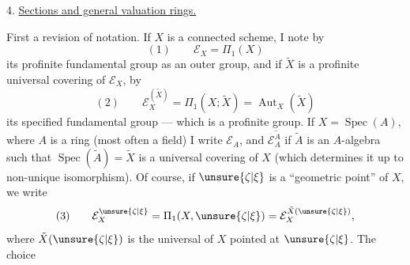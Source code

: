 4. \uline{Sections  and general valuation rings.}

First a revision of notation. If $X$ is a connected scheme, I note by 
\[
(1)\qquad \mathcal E_X=\Pi_1(X)
\]
its profinite fundamental group as an outer group, and if $\tilde X$ is a profinite universal covering of $\mathcal E_X$, by
\[
(2)\qquad \mathcal E_X^{(\tilde X)}=\Pi_1(X;\tilde X)=\operatorname{Aut}_X(\tilde X)
\]
its specified fundamental group --- which is a profinite group. If $X=\operatorname{Spec}(A)$, where $A$ is a ring (most often a field) I write $\mathcal E_A$, and $\mathcal E_A^{\tilde A}$  if $\tilde A$ is an $A$-algebra such that $\operatorname{Spec}(\tilde A)=\tilde X$ is a universal covering of $X$ (which determines it up to non-unique isomorphism). Of course, if $\unsure{\zeta|\xi}$ is a ``geometric point'' of $X$, we write
\[
(3)\qquad \mathcal E_X^{\unsure{\zeta|\xi}}=\Pi_1(X,\unsure{\zeta|\xi})=\mathcal E_X^{\tilde X(\unsure{\zeta|\xi})},
\]
where $\tilde X(\unsure{\zeta|\xi})$ is the universal  of $X$ pointed at $\unsure{\zeta|\xi}$. The choice
